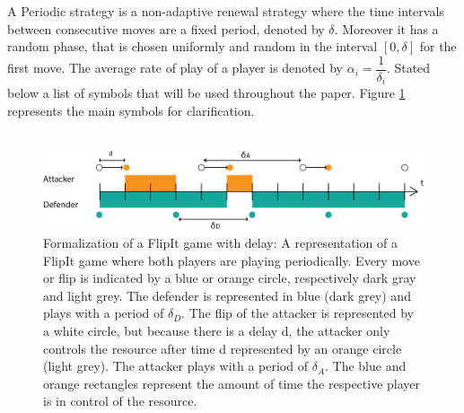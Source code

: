  A Periodic strategy is a non-adaptive renewal strategy where the time intervals between consecutive moves are a fixed period, denoted by $\delta$. Moreover it has a random phase, that is chosen uniformly and random in the interval $[0,\delta]$ for the first move. The average rate of play of a player is denoted by $\alpha_{i} = \dfrac{1}{\delta_{i}}$. Stated below a list of symbols that will be used throughout the paper. Figure \ref{FlipItDelay} represents the main symbols for clarification.\\
~~\\
\begin{figure}[hbtp]
\centering
\includegraphics[scale=0.7]{Images/DefFlip.png}
\caption{Formalization of a FlipIt game with delay: A representation of a FlipIt game where both players are playing periodically. Every move or flip is indicated by a blue or orange circle, respectively dark gray and light grey.  The defender is represented in blue (dark grey) and plays with a period of $\delta_{D}$. The flip of the attacker is represented by a white circle, but because there is a delay d, the attacker only controls the resource after time d represented by an orange circle (light grey). The attacker plays with a period of $\delta_{A}$. The blue and orange rectangles represent the amount of time the respective player is in control of the resource.}
\label{FlipItDelay}
\end{figure}

